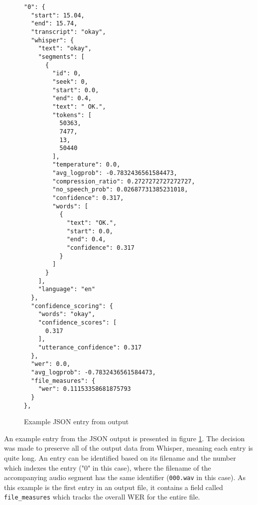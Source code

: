 \begin{figure}[p]
\centering
\begin{BVerbatim}
"0": {
  "start": 15.04,
  "end": 15.74,
  "transcript": "okay",
  "whisper": {
    "text": "okay",
    "segments": [
      {
        "id": 0,
        "seek": 0,
        "start": 0.0,
        "end": 0.4,
        "text": " OK.",
        "tokens": [
          50363,
          7477,
          13,
          50440
        ],
        "temperature": 0.0,
        "avg_logprob": -0.7832436561584473,
        "compression_ratio": 0.2727272727272727,
        "no_speech_prob": 0.02687731385231018,
        "confidence": 0.317,
        "words": [
          {
            "text": "OK.",
            "start": 0.0,
            "end": 0.4,
            "confidence": 0.317
          }
        ]
      }
    ],
    "language": "en"
  },
  "confidence_scoring": {
    "words": "okay",
    "confidence_scores": [
      0.317
    ],
    "utterance_confidence": 0.317
  },
  "wer": 0.0,
  "avg_logprob": -0.7832436561584473,
  "file_measures": {
    "wer": 0.11153358681875793
  }
},
\end{BVerbatim}
  \caption{Example JSON entry from output}
  \label{fig:json-output-example}
\end{figure}

\clearpage
An example entry from the JSON output is presented in figure \ref{fig:json-output-example}.
The decision was made to preserve all of the output data from Whisper, meaning each entry is quite long.
An entry can be identified based on its filename and the number which indexes the entry ("0" in this case), where the filename of the accompanying audio segment has the same identifier (\texttt{000.wav} in this case).
As this example is the first entry in an output file, it contains a field called \texttt{file\_measures} which tracks the overall WER for the entire file.

